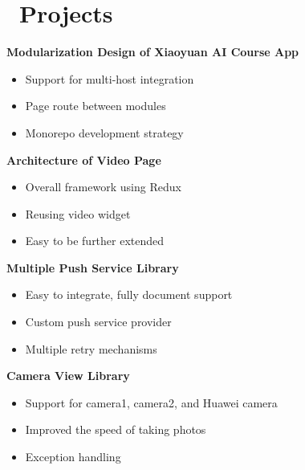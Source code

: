 \documentclass{resume}
\begin{document}
    \section{\faFileCodeO\ Projects}
    {\setlength\multicolsep{0pt}
        \begin{multicols}{2}

            \textbf{Modularization Design of Xiaoyuan AI Course App}
            \begin{itemize}
                \item Support for multi-host integration
                \item Page route between modules
                \item Monorepo development strategy
            \end{itemize}

            \textbf{Architecture of Video Page}
            \begin{itemize}
                \item Overall framework using Redux
                \item Reusing video widget
                \item Easy to be further extended
            \end{itemize}

            \textbf{Multiple Push Service Library}
            \begin{itemize}
                \item Easy to integrate, fully document support
                \item Custom push service provider
                \item Multiple retry mechanisms
            \end{itemize}

            \textbf{Camera View Library}
            \begin{itemize}
                \item Support for camera1, camera2, and Huawei camera
                \item Improved the speed of taking photos
                \item Exception handling
            \end{itemize}

        \end{multicols}}

\end{document}
